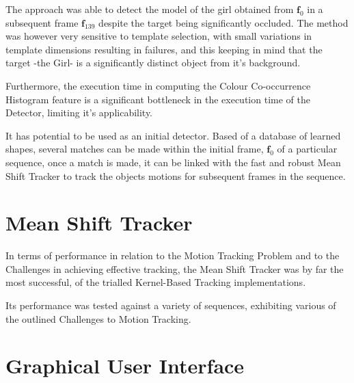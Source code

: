 The approach was able to detect the model of the girl obtained from
$\mathbf{f}_0$ in a subsequent frame $\mathbf{f}_{139}$ despite the target being
significantly occluded. 
The method was however very sensitive to template selection, with small
variations in template dimensions resulting in failures, and this keeping in
mind that the target -the Girl- is a significantly distinct object from it's
background. 

Furthermore, the execution time in computing the Colour Co-occurrence Histogram
feature is a significant bottleneck in the execution time of the Detector,
limiting it's applicability. 

It has potential to be used as an initial detector. Based of a database of
learned shapes, several matches can be made within the initial frame,
$\mathbf{f}_0$ of a particular sequence, once a match is made, it can be linked
with the fast and robust Mean Shift Tracker to track the objects motions for
subsequent frames in the sequence. 

\section{Mean Shift Tracker}
In terms of performance in relation to the Motion Tracking Problem and to the
Challenges in achieving effective tracking, the Mean Shift Tracker was by far
the most successful, of the trialled Kernel-Based Tracking implementations.

Its performance was tested against a variety of sequences, exhibiting various
of the outlined Challenges to Motion Tracking.

\section{Graphical User Interface}



